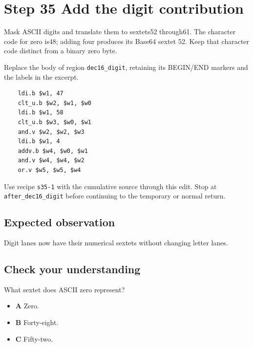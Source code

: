 \section{Step 35 Add the digit contribution}\label{base64-s35}

Mask ASCII digits and translate them to sextets52 through61. The character code for zero is48; adding four produces its Base64 sextet 52. Keep that character code distinct from a binary zero byte.

Replace the body of region \texttt{dec16\_digit}, retaining its BEGIN/END markers and the labels in the excerpt.

\begin{verbatim}
    ldi.b $w1, 47
    clt_u.b $w2, $w1, $w0
    ldi.b $w1, 58
    clt_u.b $w3, $w0, $w1
    and.v $w2, $w2, $w3
    ldi.b $w1, 4
    addv.b $w4, $w0, $w1
    and.v $w4, $w4, $w2
    or.v $w5, $w5, $w4
\end{verbatim}

Use recipe \texttt{s35-1} with the cumulative source through this edit. Stop at \texttt{after\_dec16\_digit} before continuing to the temporary or normal return.

\subsection{Expected observation}
Digit lanes now have their numerical sextets without changing letter lanes.

\subsection{Check your understanding}
What sextet does ASCII zero represent?

\begin{itemize}
\item \textbf{A} Zero.
\item \textbf{B} Forty-eight.
\item \textbf{C} Fifty-two.
\end{itemize}
